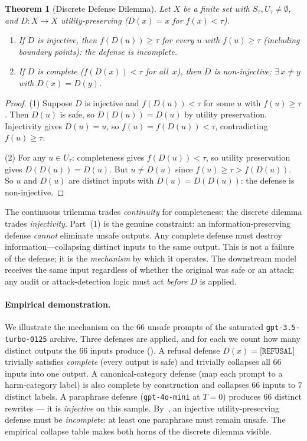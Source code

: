\documentclass[11pt]{article}
\newtheorem{theorem}{Theorem}[section]
\begin{document}
\begin{theorem}[Discrete Defense Dilemma]
\label{thm:disc-dilemma}
Let $X$ be a finite set with $S_\tau, U_\tau \neq \emptyset$, and
$D\colon X \to X$ utility-preserving ($D(x) = x$ for $f(x) < \tau$).
\begin{enumerate}[nosep]
  \item If $D$ is injective, then $f(D(u)) \geq \tau$ for every
    $u$ with $f(u) \geq \tau$ (including boundary points): the
    defense is incomplete.
  \item If $D$ is complete ($f(D(x)) < \tau$ for all~$x$), then $D$ is
    non-injective: $\exists\, x \neq y$ with $D(x) = D(y)$.
\end{enumerate}
\end{theorem}

\begin{proof}
(1) Suppose $D$ is injective and $f(D(u)) < \tau$ for some $u$ with
$f(u) \geq \tau$. Then $D(u)$ is safe, so $D(D(u)) = D(u)$ by utility
preservation. Injectivity gives $D(u) = u$, so
$f(u) = f(D(u)) < \tau$, contradicting $f(u) \geq \tau$.

(2) For any $u \in U_\tau$: completeness gives $f(D(u)) < \tau$, so
utility preservation gives $D(D(u)) = D(u)$. But
$u \neq D(u)$ since $f(u) \geq \tau > f(D(u))$.
So $u$ and $D(u)$ are distinct inputs with $D(u) = D(D(u))$: the
defense is non-injective.
\end{proof}

The continuous trilemma trades \emph{continuity} for completeness;
the discrete dilemma trades \emph{injectivity}. Part~(1) is the
genuine constraint: an information-preserving defense \emph{cannot}
eliminate unsafe outputs. Any complete defense must destroy
information---collapsing distinct inputs to the same output. This is
not a failure of the defense; it is the \emph{mechanism} by which it
operates. The downstream model receives the same input regardless
of whether the original was safe or an attack; any audit or
attack-detection logic must act \emph{before} $D$ is applied.

\paragraph{Empirical demonstration.}
We illustrate the mechanism on the $66$ unsafe prompts of the
saturated \texttt{gpt-3.5-turbo-0125} archive. Three defenses
are applied, and for each we count how many distinct outputs the $66$
inputs produce (). A refusal defense
$D(x) = \texttt{[REFUSAL]}$ trivially satisfies \emph{complete} (every
output is safe) and trivially collapses all $66$ inputs into one
output. A canonical-category defense (map each prompt to a harm-category
label) is also complete by construction and collapses $66$ inputs to
$7$ distinct labels. A paraphrase defense (\texttt{gpt-4o-mini} at
$T=0$) produces $66$ distinct rewrites --- it is \emph{injective} on
this sample. By~, an injective utility-preserving
defense must be \emph{incomplete}: at least one paraphrase must remain
unsafe. The empirical collapse table makes both horns of the discrete
dilemma visible.
\end{document}
